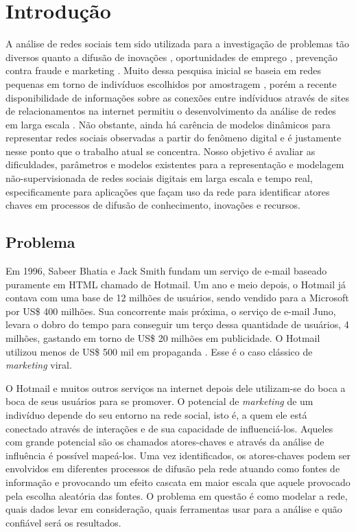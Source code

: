 \chapter{Introdução}
\label{ch:introducao}
A análise de redes sociais tem sido utilizada para a investigação de problemas
tão diversos quanto a difusão de inovações \citep{Coleman1966}, oportunidades de
emprego \citep{Granovetter1995}, prevenção contra fraude \citep{Neville2005} e
marketing \citep{Domingos2001}. Muito dessa pesquisa inicial se baseia em redes
pequenas em torno de indivíduos escolhidos por amostragem
\citep{Wasserman}\citep{Newman2006}, porém a recente disponibilidade de
informações sobre as conexões entre indíviduos através de sites de
relacionamentos na internet permitiu o desenvolvimento da análise de redes em
larga escala \citep{Boyd2007}. Não obstante, ainda há carência de modelos
dinâmicos para representar redes sociais observadas a partir do fenômeno
digital \citep{Xiang2010} e é justamente nesse ponto que o trabalho atual se
concentra. Nosso objetivo é avaliar as dificuldades, parâmetros e modelos
existentes para a representação e modelagem não-supervisionada de redes sociais
digitais em larga escala e tempo real, especificamente para aplicações que façam
uso da rede para identificar atores chaves em processos de difusão de
conhecimento, inovações e recursos.

\section{Problema}
\label{sec:problema}

Em 1996, Sabeer Bhatia e Jack Smith fundam um serviço de e-mail baseado
puramente em HTML chamado de Hotmail. Um ano e meio depois, o Hotmail já contava
com uma base de 12 milhões de usuários, sendo vendido para a Microsoft por US\$
400 milhões. Sua concorrente mais próxima, o serviço de e-mail Juno, levara o
dobro do tempo para conseguir um terço dessa quantidade de usuários, 4 milhões,
gastando em torno de US\$ 20 milhões em publicidade. O Hotmail utilizou menos de
US\$ 500 mil em propaganda \citep{Jurvetson1997}. Esse é o caso clássico de
\emph{marketing} viral.

O Hotmail e muitos outros serviços na internet depois dele utilizam-se do boca a
boca de seus usuários para se promover. O potencial de \emph{marketing} de um
indivíduo depende do seu entorno na rede social, isto é, a quem ele está
conectado através de interações e de sua capacidade de influenciá-los. Aqueles
com grande potencial são os chamados atores-chaves e através da análise de
influência é possível mapeá-los. Uma vez identificados, os atores-chaves podem
ser envolvidos em diferentes processos de difusão pela rede atuando como fontes
de informação e provocando um efeito cascata em maior escala que aquele
provocado pela escolha aleatória das fontes. O problema em questão é como
modelar a rede, quais dados levar em consideração, quais ferramentas usar para a
análise e quão confiável será os resultados.

